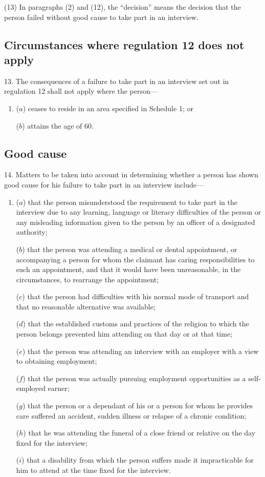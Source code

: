 \documentclass[12pt,a4paper]{article}
\begin{document}
(13) In paragraphs (2) and (12), the “decision” means the decision that the person failed without good cause to take part in an interview.

\subsection[13. Circumstances where regulation 12 does not apply]{Circumstances where regulation 12 does not apply}

13.  The consequences of a failure to take part in an interview set out in regulation 12 shall not apply where the person—
\begin{enumerate}\item[]
($a$) ceases to reside in an area specified in Schedule 1; or

($b$) attains the age of 60.
\end{enumerate}

\subsection[14. Good cause]{Good cause}

14.  Matters to be taken into account in determining whether a person has shown good cause for his failure to take part in an interview include—
\begin{enumerate}\item[]
($a$) that the person misunderstood the requirement to take part in the interview due to any learning, language or literacy difficulties of the person or any misleading information given to the person by an officer of a designated authority;

($b$) that the person was attending a medical or dental appointment, or accompanying a person for whom the claimant has caring responsibilities to such an appointment, and that it would have been unreasonable, in the circumstances, to rearrange the appointment;

($c$)  that the person had difficulties with his normal mode of transport and that no reasonable alternative was available;

($d$) that the established customs and practices of the religion to which the person belongs prevented him attending on that day or at that time;

($e$) that the person was attending an interview with an employer with a view to obtaining employment;

($f$) that the person was actually pursuing employment opportunities as a self-employed earner;

($g$) that the person or a dependant of his or a person for whom he provides care suffered an accident, sudden illness or relapse of a chronic condition;

($h$) that he was attending the funeral of a close friend or relative on the day fixed for the interview;

($i$) that a disability from which the person suffers made it impracticable for him to attend at the time fixed for the interview.
\end{enumerate}
\end{document}
